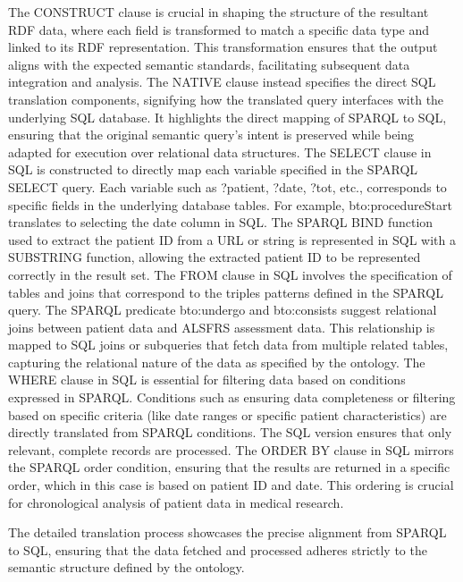 The CONSTRUCT clause is crucial in shaping the structure of the resultant RDF data, where each field is transformed to match a specific data type and linked to its RDF representation. This transformation ensures that the output aligns with the expected semantic standards, facilitating subsequent data integration and analysis.
The NATIVE clause instead specifies the direct SQL translation components, signifying how the translated query interfaces with the underlying SQL database. It highlights the direct mapping of SPARQL to SQL, ensuring that the original semantic query's intent is preserved while being adapted for execution over relational data structures.
The SELECT clause in SQL is constructed to directly map each variable specified in the SPARQL SELECT query. Each variable such as ?patient, ?date, ?tot, etc., corresponds to specific fields in the underlying database tables. For example, bto:procedureStart translates to selecting the date column in SQL. The SPARQL BIND function used to extract the patient ID from a URL or string is represented in SQL with a SUBSTRING function, allowing the extracted patient ID to be represented correctly in the result set.
The FROM clause in SQL involves the specification of tables and joins that correspond to the triples patterns defined in the SPARQL query. The SPARQL predicate bto:undergo and bto:consists suggest relational joins between patient data and ALSFRS assessment data. This relationship is mapped to SQL joins or subqueries that fetch data from multiple related tables, capturing the relational nature of the data as specified by the ontology.
The WHERE clause in SQL is essential for filtering data based on conditions expressed in SPARQL. Conditions such as ensuring data completeness or filtering based on specific criteria (like date ranges or specific patient characteristics) are directly translated from SPARQL conditions. The SQL version ensures that only relevant, complete records are processed.
The ORDER BY clause in SQL mirrors the SPARQL order condition, ensuring that the results are returned in a specific order, which in this case is based on patient ID and date. This ordering is crucial for chronological analysis of patient data in medical research.

The detailed translation process showcases the precise alignment from SPARQL to SQL, ensuring that the data fetched and processed adheres strictly to the semantic structure defined by the ontology.

